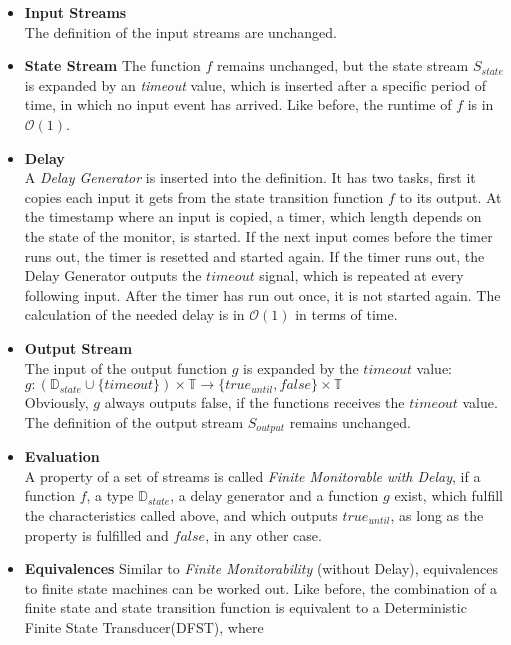 		\begin{itemize}
			\item{\textbf{Input Streams}}\\
				The definition of the input streams are unchanged.
			\item{\textbf{State Stream}}
				The function $f$ remains unchanged, but the state stream $S_{state}$ is expanded by an \emph{timeout} value, which is inserted after a specific period of time, in which no input event has arrived. Like before, the runtime of $f$ is in $\mathcal{O}(1)$.
			\item{\textbf{Delay}}\\
				\label{DelayGenerator}
				A \emph{Delay Generator} is inserted into the definition. It has two tasks, first it copies each input it gets from the state transition function $f$ to its output. At the timestamp where an input is copied, a timer, which length depends on the state of the monitor, is started. If the next input comes before the timer runs out, the timer is resetted and started again. If the timer runs out, the Delay Generator outputs the $timeout$ signal, which is repeated at every following input. After the timer has run out once, it is not started again. The calculation of the needed delay is in $\mathcal{O}(1)$ in terms of time.
			\item{\textbf{Output Stream}}\\
				The input of the output function $g$ is expanded by the $timeout$ value:\\
				$g: (\mathbb{D}_{state}\cup\{timeout\})\times \mathbb{T}\rightarrow \{true_{until}, false\}\times \mathbb{T}$\\ 
				Obviously, $g$ always outputs false, if the functions receives the $timeout$ value. The definition of the output stream $S_{output}$ remains unchanged.
			\item{\textbf{Evaluation}}\\
				A property of a set of streams is called \emph{Finite Monitorable with Delay}, if a function $f$, a type $\mathbb{D}_{state}$, a delay generator and a function $g$ exist, which fulfill the characteristics called above, and which outputs $true_{until}$, as long as the property is fulfilled and $false$, in any other case.
			\item{\textbf{Equivalences}}
				Similar to \textit{Finite Monitorability} (without Delay), equivalences to finite state machines can be worked out. Like before, the combination of a finite state and state transition function is equivalent to a Deterministic Finite State Transducer(DFST), where

\end{itemize}
